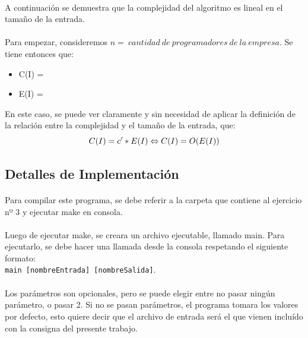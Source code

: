 \paragraph{}
A continuación se demuestra que la complejidad del algoritmo es lineal en el tamaño de la entrada.

\paragraph{}
Para empezar, consideremos $n =\ cantidad\ de\ programadores\ de\ la\ empresa$. Se tiene entonces que:
\begin{itemize}
	\item C(I) = 
	\item E(I) = 
\end{itemize}

En este caso, se puede ver claramente y sin necesidad de aplicar la definición de la relación entre la complejidad y el tamaño de la entrada, que:
\begin{equation}
	C(I) = c' * E(I) \Leftrightarrow C(I) = O(E(I))
\end{equation}


\subsection{Detalles de Implementación}

\paragraph{}
Para compilar este programa, se debe referir a la carpeta que contiene al ejercicio nº 3 y ejecutar make en consola.

\paragraph{}
Luego de ejecutar make, se creara un archivo ejecutable, llamado main. Para ejecutarlo, se debe hacer una llamada desde la consola respetando el siguiente formato:\\
\texttt{main [nombreEntrada] [nombreSalida]}.

\paragraph{}
Los parámetros son opcionales, pero se puede elegir entre no pasar ningún parámetro, o pasar 2. Si no se pasan parámetros, el programa tomara los valores por defecto, esto quiere decir que el archivo de entrada será el que vienen incluído con la consigna del presente trabajo.


